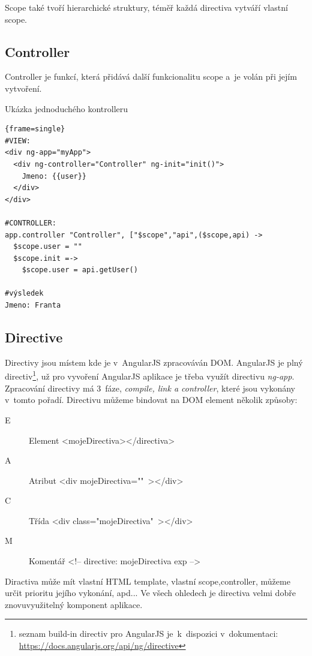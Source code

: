 \documentclass[a4paper,12pt,twoside,BCOR=10mm]{article}
\renewcommand{\it}[1]{\textit{#1}}    %
\newenvironment{codeframe}{%
  \begin{Sbox} 
    \begin{minipage} 
      {\columnwidth-\leftmargin-\rightmargin-2\fboxsep-2\fboxrule-4pt} 
}{%

  \end{minipage} 
  \end{Sbox} 
  \begin{center} 
    \fcolorbox{black}{codeback}{\TheSbox} 
  \end{center} 
}
\begin{document}
Scope také tvoří hierarchické struktury, téměř každá directiva vytváří vlastní scope.

\subsection{Controller}
Controller je funkcí, která přidává další funkcionalitu scope a~je volán při jejím vytvoření.\cite{ngBOOK}

Ukázka jednoduchého kontrolleru
     \begin{codeframe} 
      \begin{Verbatim}{frame=single}
#VIEW:
<div ng-app="myApp">
  <div ng-controller="Controller" ng-init="init()">
    Jmeno: {{user}}
  </div>
</div>

#CONTROLLER:
app.controller "Controller", ["$scope","api",($scope,api) ->
  $scope.user = ""
  $scope.init =->
    $scope.user = api.getUser()

#výsledek
Jmeno: Franta
\end{Verbatim} 
    \end{codeframe}

\subsection{Directive}
Directivy jsou místem kde je v~AngularJS zpracováván DOM. AngularJS je plný directiv\footnote{seznam build-in directiv pro AngularJS je~k~dispozici v~dokumentaci: \href{https://docs.angularjs.org/api/ng/directive}{https://docs.angularjs.org/api/ng/directive}}, už pro vyvoření AngularJS aplikace je třeba využít directivu \it{ng-app}.\\

Zpracování directivy má 3~fáze, \it{compile, link a controller}, které jsou vykonány v~tomto pořadí. Directivu můžeme bindovat na DOM element několik způsoby:
\begin{description}
\item[E] Element <mojeDirectiva></directiva>
\item[A] Atribut <div mojeDirectiva=""~></div>
\item[C] Třída <div class="mojeDirectiva"~></div>
\item[M] Komentář <!-- directive: mojeDirectiva exp -->
 \end{description}

 Diractiva může mít vlastní HTML template, vlastní scope,controller, můžeme určit prioritu jejího vykonání, apd... Ve všech ohledech je directiva velmi dobře znovuvyužitelný komponent aplikace.\\
\end{document}
